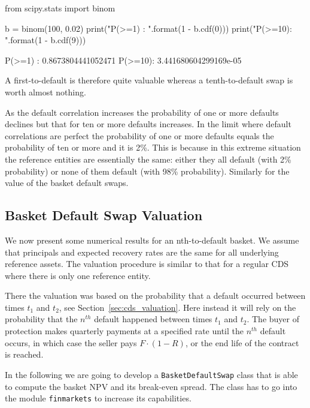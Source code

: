 \begin{ipython}
from scipy.stats import binom

b = binom(100, 0.02)
print("P(>=1) : {}".format(1 - b.cdf(0)))
print("P(>=10): {}".format(1 - b.cdf(9)))
\end{ipython}
\begin{ioutput}
P(>=1) : 0.8673804441052471
P(>=10): 3.441680604299169e-05
\end{ioutput}

A first-to-default is therefore quite valuable whereas a tenth-to-default swap is worth almost nothing.

As the default correlation increases the probability of one or more defaults declines but that for ten or more defaults increases. In the limit where default correlations are perfect the probability of one or more defaults equals the probability of ten or more and it is 2\%. This is because in this extreme situation the reference entities are essentially the same: either they all default (with 2\% probability) or none of them default (with 98\% probability). Similarly for the value of the basket default swaps.

\subsection{Basket Default Swap Valuation}
\label{basket-cds-valuation-under-market-standard-model}
We now present some numerical results for an nth-to-default basket. We assume that principals and expected recovery rates are the same for all underlying reference assets. The valuation procedure is similar to that for a regular CDS where there is only one reference entity.

There the valuation was based on the probability that a default occurred between times \(t_1\) and \(t_2\), see Section~\ref{sec:cds_valuation}. Here instead it will rely on the probability that the $n^{th}$ default happened between times \(t_1\) and \(t_2\). The buyer of protection makes quarterly payments at a specified rate until the $n^{th}$ default occurs, in which case the seller pays \(F\cdot(1-R)\), or the end life of the contract is reached. 

\begin{finmarkets}
In the following we are going to develop a \texttt{BasketDefaultSwap} class that is able to compute the basket NPV and its break-even spread. 
The class has to go into the module \texttt{finmarkets} to increase its capabilities.
\end{finmarkets}

